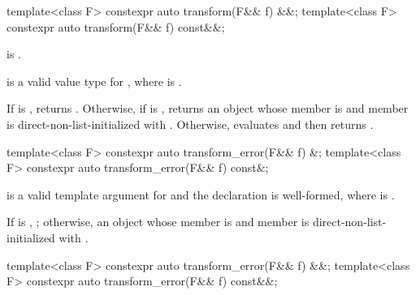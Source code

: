 %
\begin{itemdecl}
template<class F>
  constexpr auto transform(F&& f) &&;
template<class F>
  constexpr auto transform(F&& f) const&&;
\end{itemdecl}

\begin{itemdescr}
\pnum
\constraints
{} is .

\pnum
\mandates
{} is a valid value type for , where  is .

\pnum
\effects
If  is , returns . Otherwise, if  is , returns an  object whose  member is  and  member is direct-non-list-initialized with . Otherwise, evaluates  and then returns .
\end{itemdescr}

%
\begin{itemdecl}
template<class F>
  constexpr auto transform_error(F&& f) &;
template<class F>
  constexpr auto transform_error(F&& f) const&;
\end{itemdecl}

\begin{itemdescr}
\pnum
\mandates
{} is a valid template argument for  and the declaration  is well-formed, where  is .

\pnum
\returns
If  is , ; otherwise, an  object whose  member is  and  member is direct-non-list-initialized with .
\end{itemdescr}

%
\begin{itemdecl}
template<class F>
  constexpr auto transform_error(F&& f) &&;
template<class F>
  constexpr auto transform_error(F&& f) const&&;
\end{itemdecl}

